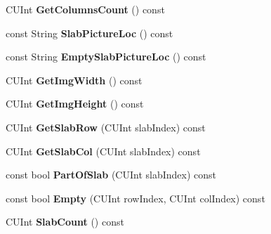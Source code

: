 \begin{DoxyCompactItemize}
\item 
\hypertarget{classCMainGrid_af74282fc8abe5909ad1cf56fb77c97dd}{C\-U\-Int {\bfseries Get\-Columns\-Count} () const }\label{classCMainGrid_af74282fc8abe5909ad1cf56fb77c97dd}

\item 
\hypertarget{classCMainGrid_a603378af3ae46ed445d3f0e8f28311fd}{const String {\bfseries Slab\-Picture\-Loc} () const }\label{classCMainGrid_a603378af3ae46ed445d3f0e8f28311fd}

\item 
\hypertarget{classCMainGrid_afac1d7d3d43eb73832517bdf978b747c}{const String {\bfseries Empty\-Slab\-Picture\-Loc} () const }\label{classCMainGrid_afac1d7d3d43eb73832517bdf978b747c}

\item 
\hypertarget{classCMainGrid_a591e1a0371d94f7619e3dccee651ec5c}{C\-U\-Int {\bfseries Get\-Img\-Width} () const }\label{classCMainGrid_a591e1a0371d94f7619e3dccee651ec5c}

\item 
\hypertarget{classCMainGrid_a3da83bb820f0f41616fc5d966146ded4}{C\-U\-Int {\bfseries Get\-Img\-Height} () const }\label{classCMainGrid_a3da83bb820f0f41616fc5d966146ded4}

\item 
\hypertarget{classCMainGrid_ac474e39e99e6a247c8f1497128a9f27a}{C\-U\-Int {\bfseries Get\-Slab\-Row} (C\-U\-Int slab\-Index) const }\label{classCMainGrid_ac474e39e99e6a247c8f1497128a9f27a}

\item 
\hypertarget{classCMainGrid_ab3dd07039ffaa820097291c89aa167a3}{C\-U\-Int {\bfseries Get\-Slab\-Col} (C\-U\-Int slab\-Index) const }\label{classCMainGrid_ab3dd07039ffaa820097291c89aa167a3}

\item 
\hypertarget{classCMainGrid_aaa74bcd67f9466b0c83c09dbfd12d653}{const bool {\bfseries Part\-Of\-Slab} (C\-U\-Int slab\-Index) const }\label{classCMainGrid_aaa74bcd67f9466b0c83c09dbfd12d653}

\item 
\hypertarget{classCMainGrid_a298c29e33aa9792b61a883fd1201adc0}{const bool {\bfseries Empty} (C\-U\-Int row\-Index, C\-U\-Int col\-Index) const }\label{classCMainGrid_a298c29e33aa9792b61a883fd1201adc0}

\item 
\hypertarget{classCMainGrid_ad1d0e61bd6f8eadae1ea371d48379aac}{C\-U\-Int {\bfseries Slab\-Count} () const }\label{classCMainGrid_ad1d0e61bd6f8eadae1ea371d48379aac}


\end{DoxyCompactItemize}
